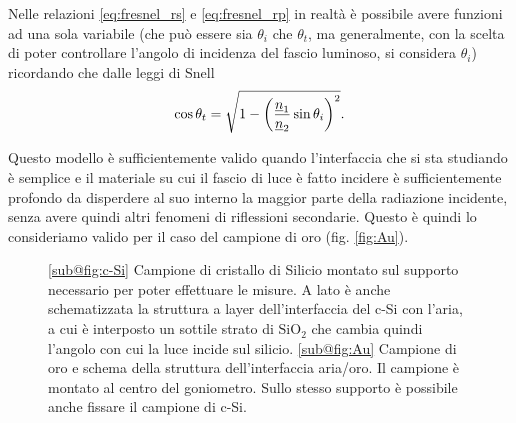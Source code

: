 \documentclass[
    prb,altaffilletter,citeautoscript,
    amsmath,amssymb,
    showpacs,showkeys,floatfix,
    reprint
]{revtex4-1}
\begin{document}
Nelle relazioni \eqref{eq:fresnel_rs} e \eqref{eq:fresnel_rp} in realtà è possibile avere funzioni ad una sola variabile (che può essere sia $\theta_i$ che $\theta_t$, ma generalmente, con la scelta di poter controllare l'angolo di incidenza del fascio luminoso, si considera $\theta_i$) ricordando che dalle leggi di Snell \begin{equation}
    \cos\theta_t = \sqrt{1-\qty(\frac{\underline n_1}{\underline n_2}\sin\theta_i)^2}.
    \label{eq:snell}
\end{equation}

Questo modello è sufficientemente valido quando l'interfaccia che si sta studiando è semplice e il materiale su cui il fascio di luce è fatto incidere è sufficientemente profondo da disperdere al suo interno la maggior parte della radiazione incidente, senza avere quindi altri fenomeni di riflessioni secondarie. Questo è quindi lo consideriamo valido per il caso del campione di oro (fig. \ref{fig:Au}).

\begin{figure}
    \centering
    \caption{\ref{sub@fig:c-Si} Campione di  cristallo di Silicio montato sul supporto necessario per poter effettuare le misure. A lato è anche schematizzata la struttura a layer dell'interfaccia del c-Si con l'aria, a cui è interposto un sottile strato di $\mathrm{SiO_2}$ che cambia quindi l'angolo con cui la luce incide sul silicio. \ref{sub@fig:Au} Campione di oro e schema della struttura dell'interfaccia aria/oro. Il campione è montato al centro del goniometro. Sullo stesso supporto è possibile anche fissare il campione di c-Si.}
    \label{fig:c-Si/Au_samples}
\end{figure}
\end{document}
